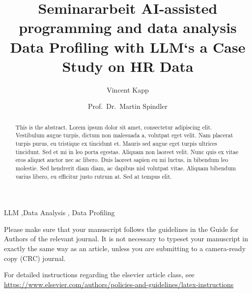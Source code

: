 \documentclass[
  authoryear,
  preprint]{elsarticle}
\begin{document}
\begin{frontmatter}
\title{Seminararbeit AI-assisted programming and data
analysis \\\large{Data Profiling with LLM`s a Case Study on HR Data} }
\author[1]{Vincent Kapp%
%
}
\author[2]{Prof.~Dr.~Martin Spindler%
%
}


        
\begin{abstract}
This is the abstract. Lorem ipsum dolor sit amet, consectetur adipiscing
elit. Vestibulum augue turpis, dictum non malesuada a, volutpat eget
velit. Nam placerat turpis purus, eu tristique ex tincidunt et. Mauris
sed augue eget turpis ultrices tincidunt. Sed et mi in leo porta
egestas. Aliquam non laoreet velit. Nunc quis ex vitae eros aliquet
auctor nec ac libero. Duis laoreet sapien eu mi luctus, in bibendum leo
molestie. Sed hendrerit diam diam, ac dapibus nisl volutpat vitae.
Aliquam bibendum varius libero, eu efficitur justo rutrum at. Sed at
tempus elit.
\end{abstract}





\begin{keyword}
    LLM \sep Data Analysis \sep 
    Data Profiling
\end{keyword}
\end{frontmatter}
    
Please make sure that your manuscript follows the guidelines in the
Guide for Authors of the relevant journal. It is not necessary to
typeset your manuscript in exactly the same way as an article, unless
you are submitting to a camera-ready copy (CRC) journal.

For detailed instructions regarding the elsevier article class, see
\url{https://www.elsevier.com/authors/policies-and-guidelines/latex-instructions}
\end{document}
